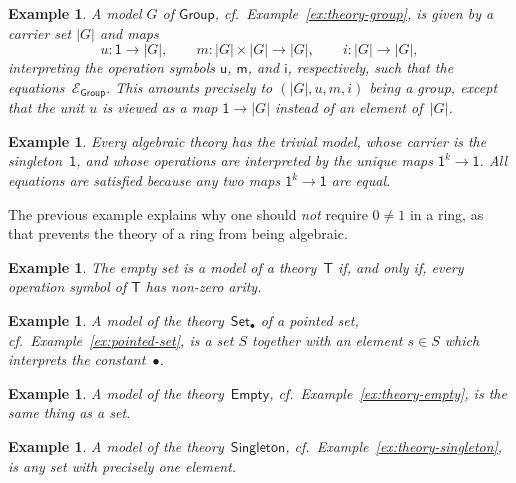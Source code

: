 \documentclass{amsart}
\newcommand{\theory}[1]{\mathsf{#1}} %
\newcommand{\equations}[1]{\mathcal{E}_{\theory{#1}}} %
\newcommand{\carrier}[1]{|#1|} %
\newcommand{\one}{\mathsf{1}} %
\newtheorem{example}[definition]{Example}
\begin{document}
\begin{example}
  A model $G$ of $\theory{Group}$, cf.\ Example~\ref{ex:theory-group}, is given by a
  carrier set $\carrier{G}$ and maps
  \begin{equation*}
    u : \one \to \carrier{G},\qquad
    m : \carrier{G} \times \carrier{G} \to \carrier{G},\qquad
    i : \carrier{G} \to \carrier{G},
  \end{equation*}
  interpreting the operation symbols $\mathsf{u}$, $\mathsf{m}$, and $\mathsf{i}$,
  respectively, such that the equations~$\equations{Group}$. This amounts precisely to
  $(\carrier{G}, u, m, i)$ being a group, except that the unit $u$ is viewed as a map
  $\one \to \carrier{G}$ instead of an element of~$\carrier{G}$.
\end{example}

\begin{example}
  Every algebraic theory has the \emph{trivial model}, whose carrier is the
  singleton~$\one$, and whose operations are interpreted by the unique maps
  $\one^k \to \one$. All equations are satisfied because any two maps $\one^k \to \one$
  are equal.
\end{example}

The previous example explains why one should \emph{not} require $0 \neq 1$ in a ring, as
that prevents the theory of a ring from being algebraic.

\begin{example}
  The empty set is a model of a theory~$\theory{T}$ if, and only if, every operation symbol
  of $\theory{T}$ has non-zero arity.
\end{example}

\begin{example}
  A model of the theory~$\theory{Set_\bullet}$ of a pointed set, cf.\
  Example~\ref{ex:pointed-set}, is a set $S$ together with an element $s \in S$ which
  interprets the constant~$\bullet$.
\end{example}

\begin{example}
  A model of the theory~$\theory{Empty}$, cf.\ Example~\ref{ex:theory-empty}, is the same
  thing as a set.
\end{example}

\begin{example}
  A model of the theory~$\theory{Singleton}$, cf.\ Example~\ref{ex:theory-singleton}, is
  any set with precisely one element.
\end{example}
\end{document}
